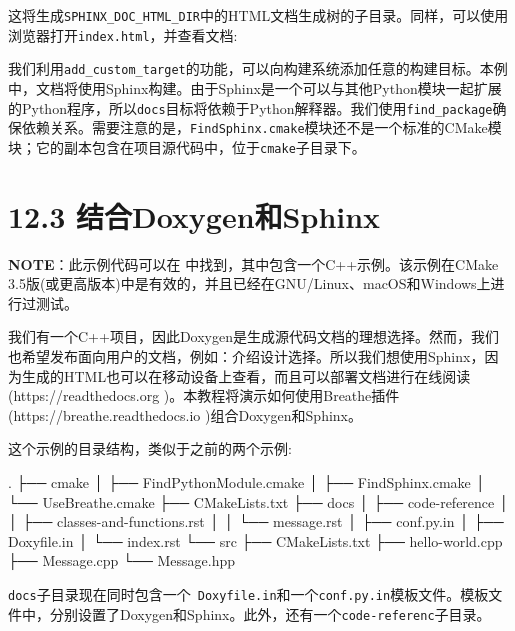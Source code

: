 这将生成\texttt{SPHINX\_DOC\_HTML\_DIR}中的HTML文档生成树的子目录。同样，可以使用浏览器打开\texttt{index.html}，并查看文档:



我们利用\texttt{add\_custom\_target}的功能，可以向构建系统添加任意的构建目标。本例中，文档将使用Sphinx构建。由于Sphinx是一个可以与其他Python模块一起扩展的Python程序，所以\texttt{docs}目标将依赖于Python解释器。我们使用\texttt{find\_package}确保依赖关系。需要注意的是，\texttt{FindSphinx.cmake}模块还不是一个标准的CMake模块；它的副本包含在项目源代码中，位于\texttt{cmake}子目录下。


\section{12.3 结合Doxygen和Sphinx}

\begin{myInfoBox}
\textbf{NOTE}：此示例代码可以在  中找到，其中包含一个C++示例。该示例在CMake 3.5版(或更高版本)中是有效的，并且已经在GNU/Linux、macOS和Windows上进行过测试。
\end{myInfoBox}

我们有一个C++项目，因此Doxygen是生成源代码文档的理想选择。然而，我们也希望发布面向用户的文档，例如：介绍设计选择。所以我们想使用Sphinx，因为生成的HTML也可以在移动设备上查看，而且可以部署文档进行在线阅读(https://readthedocs.org )。本教程将演示如何使用Breathe插件(https://breathe.readthedocs.io )组合Doxygen和Sphinx。


这个示例的目录结构，类似于之前的两个示例:

\begin{codebox}[shell]
.
├── cmake
│    ├── FindPythonModule.cmake
│    ├── FindSphinx.cmake
│    └── UseBreathe.cmake
├── CMakeLists.txt
├── docs
│    ├── code-reference
│    │    ├── classes-and-functions.rst
│    │    └── message.rst
│    ├── conf.py.in
│    ├── Doxyfile.in
│    └── index.rst
└── src
    ├── CMakeLists.txt
    ├── hello-world.cpp
    ├── Message.cpp
    └── Message.hpp
\end{codebox}

\texttt{docs}子目录现在同时包含一个\texttt{ Doxyfile.in}和一个\texttt{conf.py.in}模板文件。模板文件中，分别设置了Doxygen和Sphinx。此外，还有一个\texttt{code-referenc}子目录。

